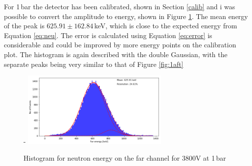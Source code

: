 \documentclass[a4paper]{article}
\begin{document}
\newline For 1\,bar the detector has been calibrated, shown in Section \ref{calib} and i was possible to convert the amplitude to energy, shown in Figure \ref{fig:1ev}. The mean energy of the peak is $625.91 \pm 162.84$\,keV, which is close to the expected energy from Equation \ref{eq:neu}. The error is calculated using Equation \ref{eq:error} is considerable and could be improved by more energy points on the calibration plot. The histogram is again described with the double Gaussian, with the separate peaks being very similar to that of Figure \ref{fig:1aft}
\begin{figure}[H]- 
    \centering
    \includegraphics[height=3.7cm]{plots/uk24n001_ev.png}
    \caption{Histogram for neutron energy on the far channel for 3800V at 1\,bar}
    \label{fig:1ev}
\end{figure}
\end{document}
